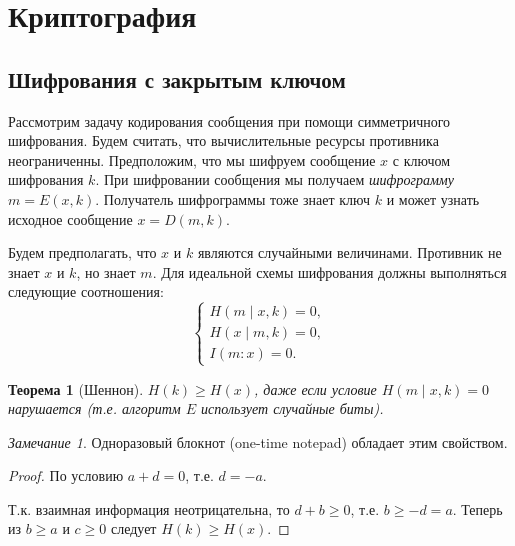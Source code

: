 \documentclass[12pt]{article}
\theoremstyle{definition}
\theoremstyle{plain}
\newtheorem{theorem}{Теорема}[section]
\theoremstyle{remark}
\newtheorem{remark}{Замечание}[section]
\begin{document}
\section{Криптография}
\subsection{Шифрования с закрытым ключом}

Рассмотрим задачу кодирования сообщения при помощи симметричного шифрования.
Будем считать, что вычислительные ресурсы противника неограниченны. 
Предположим, что мы шифруем сообщение $x$ с ключом шифрования $k$. При
шифровании сообщения мы получаем \emph{шифрограмму} $m = E(x, k)$.
Получатель шифрограммы тоже знает ключ $k$ и может узнать исходное
сообщение $x= D(m,k).$

Будем предполагать, что $x$ и $k$ являются случайными 
величинами. Противник не знает $x$ и $k$, но знает $m$. Для идеальной
схемы шифрования должны выполняться следующие соотношения:
\[
\begin{cases}
    H(m\mid x,k) = 0,\\
    H(x\mid m,k) = 0,\\
    I(m : x) = 0.
\end{cases}
\]

\begin{theorem}[Шеннон]
    $H(k)\ge H(x)$, даже если условие $H(m\mid x,k) = 0$ нарушается 
    (т.е. алгоритм $E$ использует случайные биты).
\end{theorem}     
\begin{remark}
    Одноразовый блокнот (one-time notepad) обладает этим свойством.
\end{remark}
\begin{proof}
    По условию $a + d = 0$, т.е. $d = -a$. 

    \begin{center}
    \end{center}
    Т.к. взаимная информация неотрицательна, то $d + b\ge 0$, т.е. 
    $b \ge -d = a$. Теперь из $b \ge a$ и $c\ge 0$ следует $H(k)\ge H(x)$.                                  
\end{proof}
\end{document}
